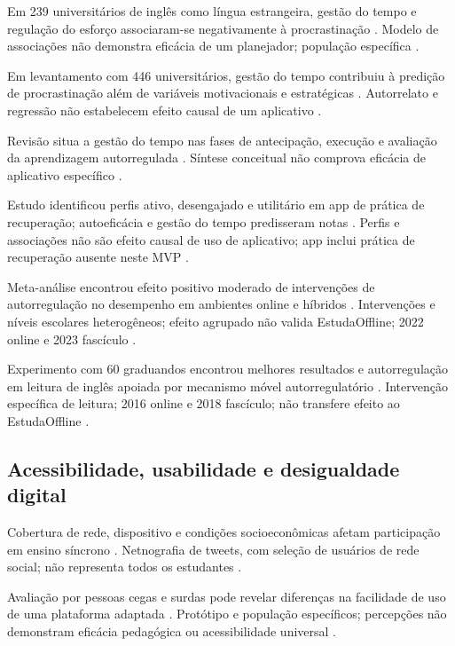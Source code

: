 Em 239 universitários de inglês como língua estrangeira, gestão do tempo e regulação do esforço associaram-se negativamente à procrastinação \citep{education_tao2025}. Modelo de associações não demonstra eficácia de um planejador; população específica \citep{education_tao2025}.

Em levantamento com 446 universitários, gestão do tempo contribuiu à predição de procrastinação além de variáveis motivacionais e estratégicas \citep{education_wolters2017}. Autorrelato e regressão não estabelecem efeito causal de um aplicativo \citep{education_wolters2017}.

Revisão situa a gestão do tempo nas fases de antecipação, execução e avaliação da aprendizagem autorregulada \citep{education_wolters2021}. Síntese conceitual não comprova eficácia de aplicativo específico \citep{education_wolters2021}.

Estudo identificou perfis ativo, desengajado e utilitário em app de prática de recuperação; autoeficácia e gestão do tempo predisseram notas \citep{education_wong2026}. Perfis e associações não são efeito causal de uso de aplicativo; app inclui prática de recuperação ausente neste MVP \citep{education_wong2026}.

Meta-análise encontrou efeito positivo moderado de intervenções de autorregulação no desempenho em ambientes online e híbridos \citep{education_xu2022}. Intervenções e níveis escolares heterogêneos; efeito agrupado não valida EstudaOffline; 2022 online e 2023 fascículo \citep{education_xu2022}.

Experimento com 60 graduandos encontrou melhores resultados e autorregulação em leitura de inglês apoiada por mecanismo móvel autorregulatório \citep{education_zheng2016}. Intervenção específica de leitura; 2016 online e 2018 fascículo; não transfere efeito ao EstudaOffline \citep{education_zheng2016}.

\subsection{Acessibilidade, usabilidade e desigualdade digital}

Cobertura de rede, dispositivo e condições socioeconômicas afetam participação em ensino síncrono \citep{azionya2021}. Netnografia de tweets, com seleção de usuários de rede social; não representa todos os estudantes \citep{azionya2021}.

Avaliação por pessoas cegas e surdas pode revelar diferenças na facilidade de uso de uma plataforma adaptada \citep{batanero2021}. Protótipo e população específicos; percepções não demonstram eficácia pedagógica ou acessibilidade universal \citep{batanero2021}.

